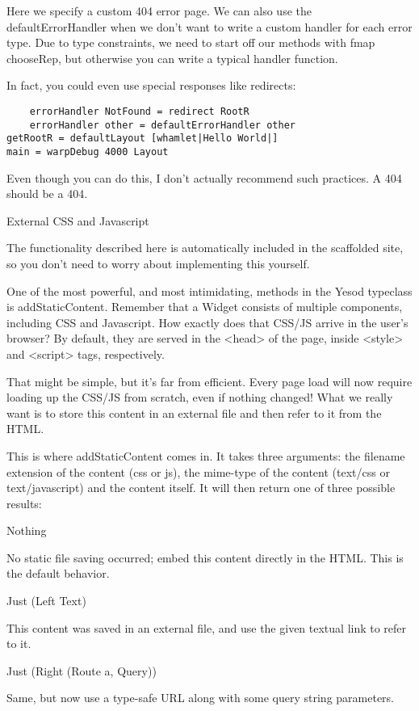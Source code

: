 Here we specify a custom 404 error page. We can also use the defaultErrorHandler when we don't want to write a custom handler for each error type. Due to type constraints, we need to start off our methods with fmap chooseRep, but otherwise you can write a typical handler function.

In fact, you could even use special responses like redirects:

\begin{lstlisting}
    errorHandler NotFound = redirect RootR
    errorHandler other = defaultErrorHandler other
getRootR = defaultLayout [whamlet|Hello World|]
main = warpDebug 4000 Layout
\end{lstlisting}

Even though you can do this, I don't actually recommend such practices. A 404 should be a 404.

External CSS and Javascript

The functionality described here is automatically included in the scaffolded site, so you don't need to worry about implementing this yourself.

One of the most powerful, and most intimidating, methods in the Yesod typeclass is addStaticContent. Remember that a Widget consists of multiple components, including CSS and Javascript. How exactly does that CSS/JS arrive in the user's browser? By default, they are served in the <head> of the page, inside <style> and <script> tags, respectively.

That might be simple, but it's far from efficient. Every page load will now require loading up the CSS/JS from scratch, even if nothing changed! What we really want is to store this content in an external file and then refer to it from the HTML.

This is where addStaticContent comes in. It takes three arguments: the filename extension of the content (css or js), the mime-type of the content (text/css or text/javascript) and the content itself. It will then return one of three possible results:

Nothing

No static file saving occurred; embed this content directly in the HTML. This is the default behavior.

Just (Left Text)

This content was saved in an external file, and use the given textual link to refer to it.

Just (Right (Route a, Query))

Same, but now use a type-safe URL along with some query string parameters.

